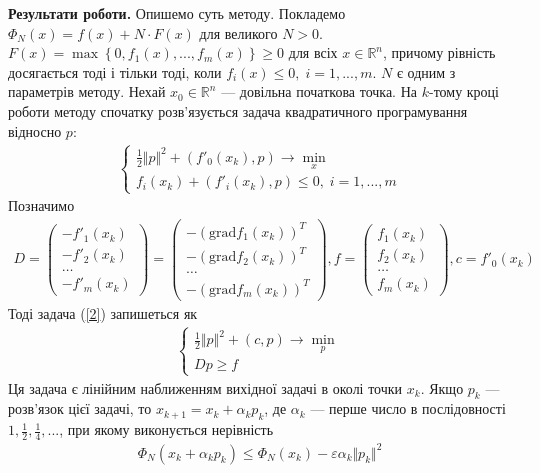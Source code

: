 \documentclass{extreport}
\begin{document}
\noindent\textbf{Результати роботи.}
Опишемо суть методу. Покладемо $\Phi_N (x) = f(x) + N\cdot F(x)$ для великого $N>0$. $F(x) = \max\left\{0, f_1(x), ..., f_m(x)\right\} \geq 0$
для всіх $x \in \mathbb{R}^n$, причому рівність досягається тоді і тільки тоді, коли $f_i(x) \leq 0, \; i = 1,...,m$.
$N$ є одним з параметрів методу. Нехай $x_0 \in \mathbb{R}^n$ --- довільна початкова точка. На $k$-тому кроці роботи методу спочатку розв'язується
задача квадратичного програмування відносно $p$:
\begin{gather}\label{2}
    \begin{cases}
        \frac{1}{2} \Vert p \Vert^2 + \left(f'_0(x_k), p\right) \to \underset{x}{\min} \\
        f_i(x_k) + \left(f'_i(x_k), p\right) \leq 0, \; i = 1, ..., m
    \end{cases}
\end{gather}
Позначимо
\begin{gather*}
    D = \begin{pmatrix}
        -f'_1 (x_k) \\
        -f'_2 (x_k) \\
        \dots \\
        -f'_m(x_k)
    \end{pmatrix} = 
    \begin{pmatrix}
        -(\mathrm{grad}f_1 (x_k))^T \\
        -(\mathrm{grad}f_2 (x_k))^T \\
        \dots \\
        -(\mathrm{grad}f_m (x_k))^T
    \end{pmatrix},
    f = \begin{pmatrix}
        f_1(x_k) \\
        f_2(x_k) \\
        \dots \\
        f_m(x_k)
    \end{pmatrix},
    c = f'_0(x_k)
\end{gather*}
Тоді задача (\ref{2}) запишеться як
\begin{gather}\label{3}
    \begin{cases}
        \frac{1}{2} \Vert p \Vert^2 + \left(c, p\right) \to \underset{p}{\min} \\
        D p \geq f
    \end{cases}
\end{gather}
Ця задача є лінійним наближенням вихідної задачі в околі точки $x_k$.
Якщо $p_k$ --- розв'язок цієї задачі, то $x_{k+1} = x_k + \alpha_k p_k$, де $\alpha_k$ --- перше число в послідовності $1, \frac{1}{2}, \frac{1}{4}, ...$,
при якому виконується нерівність
\begin{gather}
    \Phi_N (x_k + \alpha_k p_k) \leq \Phi_N(x_k) - \varepsilon \alpha_k \Vert p_k \Vert^2
\end{gather}
\end{document}
